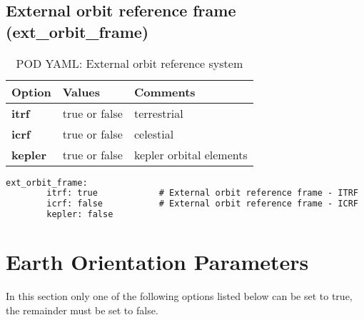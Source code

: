 \subsection{External orbit reference frame (ext\_orbit\_frame)}
\begin{table}[h!]
	\begin{tabular}{|p{4.5cm}|p{2cm}|p{3.5cm}|}
		\hline
		Option & Values & Comments \\
		\hline
		\textbf{itrf}  & true or false & terrestrial\\
		\textbf{icrf}  & true or false & celestial\\
		\textbf{kepler} & true or false & kepler orbital elements\\
        \hline
	\end{tabular}
	\caption{POD YAML: External orbit reference system}
	\label{table:pod_yaml_ext_orbit_ref_system}
\end{table}
%
\begin{lstlisting}[language=xml,caption=external orbit reference frame yaml configuration example]
   ext_orbit_frame:
		itrf: true            # External orbit reference frame - ITRF
		icrf: false           # External orbit reference frame - ICRF
		kepler: false	
\end{lstlisting}
%        
\section{Earth Orientation Parameters}
In this section only one of the following options listed below can be set to true, the remainder must be set to false.\\
